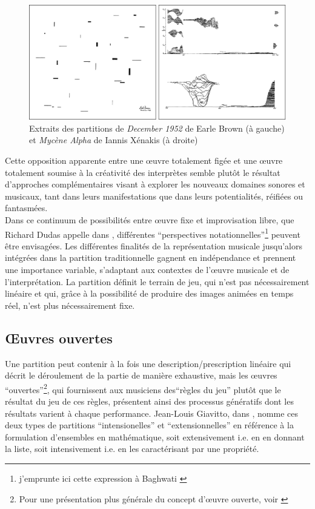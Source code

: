 \begin{figure}[!htbp]
	\includegraphics[width=\textwidth]{gfx/notation/Brown-Xenakis-Paysage.png}
	\caption{Extraits des partitions de \textit{December 1952} de Earle Brown (à gauche) et \textit{Mycène Alpha} de Iannis Xénakis (à droite)}
	\label{fig:notation:brown-xenakis}
\end{figure}

Cette opposition apparente entre une œuvre totalement figée et une œuvre totalement soumise à la créativité des interprètes semble plutôt le résultat d'approches complémentaires visant à explorer les nouveaux domaines sonores et musicaux, tant dans leurs manifestations que dans leurs potentialités, réifiées ou fantasmées.\\
\indent Dans ce continuum de possibilités entre œuvre fixe et improvisation libre, que Richard Dudas appelle  dans \cite{dudas_comprovisation:_2010}, différentes ``perspectives notationnelles''\footnote{j'emprunte ici cette expression à Baghwati \cite{bhagwati_notational_2013}} peuvent être envisagées. Les différentes finalités de la représentation musicale jusqu'alors intégrées dans la partition traditionnelle gagnent en indépendance et prennent une importance variable, s'adaptant aux contextes de l'œuvre musicale et de l'interprétation. La partition définit le terrain de jeu, qui n'est pas nécessairement linéaire et qui, grâce à la possibilité de produire des images animées en temps réel, n'est plus nécessairement fixe.

\subsection{Œuvres ouvertes}

\noindent Une partition peut contenir à la fois une description/prescription linéaire qui décrit le déroulement de la partie de manière exhaustive, mais les œuvres ``ouvertes''\footnote{Pour une présentation plus générale du concept d'œuvre ouverte, voir \cite{eco_oeuvre_2015}}, qui fournissent aux musiciens des``règles du jeu'' plutôt que le résultat du jeu de ces règles, présentent ainsi des processus génératifs dont les résultats varient à chaque performance. Jean-Louis Giavitto, dans \cite{giavitto_du_2014}, nomme ces deux types de partitions ``intensionelles'' et ``extensionnelles'' en référence à la formulation d'ensembles en mathématique, soit extensivement i.e. en en donnant la liste, soit intensivement i.e. en les caractérisant par une propriété. 

